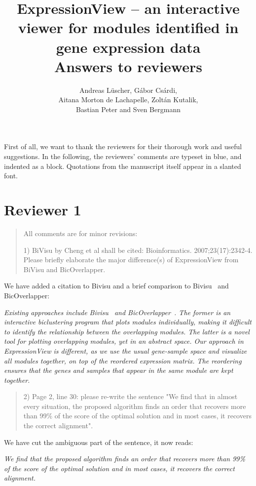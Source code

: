\documentclass[a4paper]{article}
\title{ExpressionView -- an interactive viewer for
  modules identified in gene expression data\\[10pt]
  Answers to reviewers}
\author{Andreas L\"uscher, G\'abor Cs\'ardi, \\ Aitana Morton de
  Lachapelle, Zolt\'an Kutalik, \\ Bastian Peter and Sven Bergmann}
\newenvironment{myquote}{\begin{quote}\color{blue}}{\end{quote}}
\begin{document}
\maketitle

\RaggedRight

First of all, we want to thank the reviewers for their thorough work
and useful suggestions. In the following, the reviewers' comments are
typeset in blue, and indented as a block. Quotations from the
manuscript itself appear in a slanted font.

\section*{Reviewer 1}

\begin{myquote}
All comments are for minor revisions:

1) BiVisu by Cheng et al shall be cited:
Bioinformatics. 2007;23(17):2342-4. Please briefly elaborate the major
difference(s) of ExpressionView from BiVisu and BicOverlapper.
\end{myquote}

We have added a citation to Bivisu and a brief comparison to
Bivisu~\citep{cheng07} and BicOverlapper\citep{santamaria08}:

\textsl{Existing approaches include Bivisu~\citep{cheng07} and
BicOverlapper~\citep{santamaria08}. The former is an interactive
biclustering program that plots modules individually, making it
difficult to identify the relationship between the overlapping
modules. The latter is a novel tool for plotting overlapping modules,
yet in an abstract space. Our approach in ExpressionView is different,
as we use the usual gene-sample space and visualize all modules
together, on top of the reordered expression matrix. The reordering
ensures that the genes and samples that appear in the same module are
kept together.}

\begin{myquote}
2) Page 2, line 30: please re-write the sentence "We find that in
almost every situation, the proposed algorithm finds an order that
recovers more than 99\% of the score of the optimal solution and in
most cases, it recovers the correct alignment". 
\end{myquote}

We have cut the ambiguous part of the sentence, it now reads:

\textsl{We find that the proposed algorithm finds an
order that recovers more than 99\% of the score of the optimal
solution and in most cases, it recovers the correct
alignment.}
\end{document}

